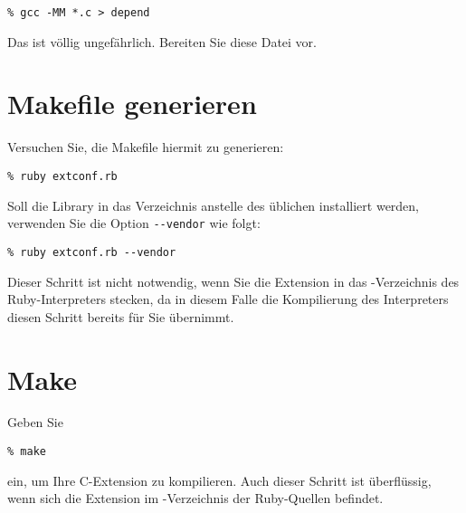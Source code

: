 \begin{verbatim}
% gcc -MM *.c > depend
\end{verbatim}

\noindent Das ist völlig ungefährlich. Bereiten Sie diese Datei vor.

\section{Makefile generieren}
\label{sec:makefile-generieren}

Versuchen Sie, die Makefile hiermit zu generieren:

\begin{verbatim}
% ruby extconf.rb
\end{verbatim}

Soll die Library in das Verzeichnis  anstelle des
üblichen  installiert werden, verwenden Sie die Option
\verb+--vendor+ wie folgt:

\begin{verbatim}
% ruby extconf.rb --vendor
\end{verbatim}

Dieser Schritt ist nicht notwendig, wenn Sie die Extension in das
-Verzeichnis des Ruby-Interpreters stecken, da in diesem
Falle die Kompilierung des Interpreters diesen Schritt bereits für Sie
übernimmt.


\section{Make}
\label{sec:make}

Geben Sie

\begin{verbatim}
% make
\end{verbatim}

\noindent ein, um Ihre C-Extension zu kompilieren. Auch dieser Schritt
ist überflüssig, wenn sich die Extension im -Verzeichnis der
Ruby-Quellen befindet.

